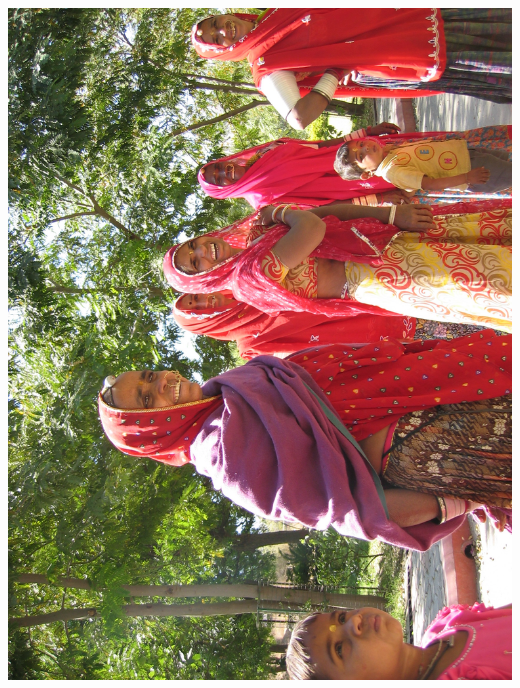 %
\newpage\vspace*{-5cm}
\thispagestyle{empty}
\hspace*{-4cm}
\includegraphics[width=15.9cm]{articles/pagesCentrales/inde411.jpg}


